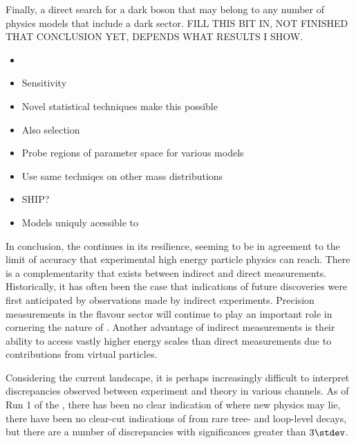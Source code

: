 Finally, a direct search for a dark boson that may belong to any number of \bsm physics models that
include a dark sector.
FILL THIS BIT IN, NOT FINISHED THAT CONCLUSION YET, DEPENDS WHAT RESULTS I SHOW.
\begin{itemize}
  \item \btokstrdb
  \item Sensitivity
  \item Novel statistical techniques make this possible
  \item Also selection
  \item Probe regions of parameter space for various models
  \item Use same techniqes on other mass distributions
  \item SHIP?
  \item Models uniquly acessible to \lhcb
\end{itemize}



In conclusion, the \sm continues in its resilience, seeming to be in agreement to the limit of
accuracy that experimental high energy particle physics can reach.
There is a complementarity that exists between indirect and direct measurements.
Historically, it has often been the case that indications of future discoveries were first
anticipated by observations made by indirect experiments.
Precision measurements in the flavour sector will continue to play an important role in cornering
the nature of \np.
Another advantage of indirect measurements is their ability to access vastly higher energy scales
than direct measurements due to contributions from virtual particles.

Considering the current landscape, it is perhaps increasingly difficult to interpret
discrepancies observed between experiment and theory in various channels.
As of Run 1 of the \lhc, there has been no clear indication of where new physics may lie, there
have been no clear-cut indications of \np from rare tree- and loop-level decays, but there are a
number of discrepancies with significances greater than $3\stdev$.

